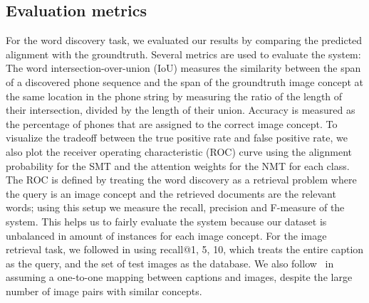 \documentclass[a4paper]{article}
\begin{document}
\subsection{Evaluation metrics}
For the word discovery task, we evaluated our results by comparing the predicted alignment with the groundtruth.
Several metrics are used to evaluate the system:
The word intersection-over-union (IoU) measures
the similarity between the span of a discovered phone sequence and the span of the
groundtruth image concept at the same location in the phone string
by measuring the ratio of the length of their intersection, divided by the length of their union.
Accuracy is measured as the percentage of phones that are assigned to the correct image concept.
To visualize the tradeoff between the true positive rate and false positive rate, we also plot the receiver operating characteristic (ROC) curve using the alignment probability for the SMT and the attention weights for the NMT for each class.
The ROC is defined by treating 
the word discovery as a retrieval problem where the query is an image concept and the retrieved documents are the relevant words;
using this setup we 
measure the recall, precision and F-measure of the system. This helps us to fairly evaluate the system because our dataset is unbalanced in amount of instances for each image concept. 
For the image retrieval task, we followed \cite{Harwath15,Karpathy14}
in using recall@1, 5, 10, which treats the entire caption as the query,
and the set of test images as the database.
We also follow~\cite{Harwath15,Karpathy14} in assuming a one-to-one mapping between captions and images,
despite the large number of image pairs with similar concepts. 

\end{document}
